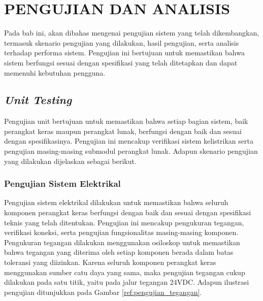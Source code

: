 

\chapter{PENGUJIAN DAN ANALISIS}
\label{chap:pengujiananalisis}

Pada bab ini, akan dibahas mengenai pengujian sistem yang telah dikembangkan,
termasuk skenario pengujian yang dilakukan, hasil pengujian, serta analisis
terhadap performa sistem. Pengujian ini bertujuan untuk memastikan bahwa sistem berfungsi
sesuai dengan spesifikasi yang telah ditetapkan dan dapat memenuhi kebutuhan pengguna.

\section{\emph{Unit Testing}}
Pengujian unit bertujuan untuk memastikan bahwa setiap bagian sistem, baik
perangkat keras maupun perangkat lunak, berfungsi dengan baik dan sesuai dengan spesifikasinya.
Pengujian ini mencakup verifikasi sistem kelistrikan serta pengujian masing-masing
submodul perangkat lunak. Adapun skenario pengujian yang dilakukan dijelaskan sebagai
berikut.

\subsection{Pengujian Sistem Elektrikal}
Pengujian sistem elektrikal dilakukan untuk memastikan bahwa seluruh komponen perangkat keras berfungsi dengan baik dan sesuai dengan spesifikasi teknis yang telah ditentukan. Pengujian ini mencakup pengukuran tegangan, verifikasi koneksi, serta pengujian fungsionalitas masing-masing komponen. Pengukuran tegangan dilakukan menggunakan osiloskop untuk memastikan bahwa tegangan yang diterima oleh setiap komponen berada dalam batas toleransi yang diizinkan. Karena seluruh komponen perangkat keras menggunakan sumber catu daya yang sama, maka pengujian tegangan cukup dilakukan pada satu titik, yaitu pada jalur tegangan 24VDC. Adapun ilustrasi pengujian ditunjukkan pada Gambar \ref{ref:pengujian_tegangan}.


